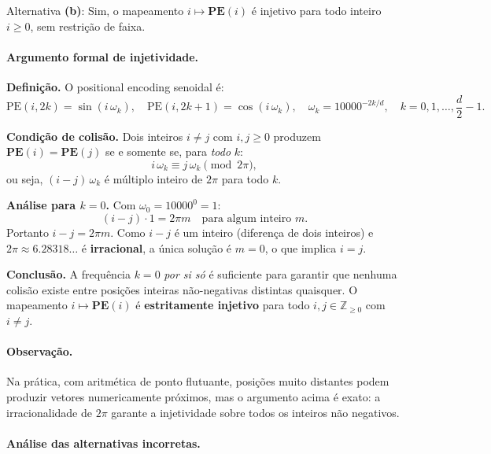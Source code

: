 \documentclass{dlproblemset}
\begin{document}
\begin{respostabox}
Alternativa \textbf{(b)}: Sim, o mapeamento $i \mapsto \mathbf{PE}(i)$ é injetivo
para todo inteiro $i \geq 0$, sem restrição de faixa.
\end{respostabox}

\paragraph{Argumento formal de injetividade.}

\textbf{Definição.} O positional encoding senoidal é:
\[
  \mathrm{PE}(i, 2k)   = \sin\!\left(i\,\omega_k\right),\quad
  \mathrm{PE}(i, 2k+1) = \cos\!\left(i\,\omega_k\right),\quad
  \omega_k = 10000^{-2k/d},\quad k = 0, 1, \ldots, \frac{d}{2}-1.
\]

\textbf{Condição de colisão.} Dois inteiros $i \neq j$ com $i, j \geq 0$ produzem
$\mathbf{PE}(i) = \mathbf{PE}(j)$ se e somente se, para \emph{todo} $k$:
\[
  i\,\omega_k \equiv j\,\omega_k \pmod{2\pi},
\]
ou seja, $(i - j)\,\omega_k$ é múltiplo inteiro de $2\pi$ para todo $k$.

\textbf{Análise para $k = 0$.} Com $\omega_0 = 10000^0 = 1$:
\[
  (i - j) \cdot 1 = 2\pi m \quad \text{para algum inteiro } m.
\]
Portanto $i - j = 2\pi m$. Como $i - j$ é um inteiro (diferença de dois inteiros) e
$2\pi \approx 6.28318\ldots$ é \textbf{irracional}, a única solução é $m = 0$,
o que implica $i = j$.

\textbf{Conclusão.} A frequência $k = 0$ \emph{por si só} é suficiente para garantir
que nenhuma colisão existe entre posições inteiras não-negativas distintas quaisquer.
O mapeamento $i \mapsto \mathbf{PE}(i)$ é \textbf{estritamente injetivo} para todo
$i, j \in \mathbb{Z}_{\geq 0}$ com $i \neq j$.

\paragraph{Observação.}
Na prática, com aritmética de ponto flutuante, posições muito distantes podem
produzir vetores numericamente próximos, mas o argumento acima é exato: a
irracionalidade de $2\pi$ garante a injetividade sobre todos os inteiros
não negativos.

\paragraph{Análise das alternativas incorretas.}
\end{document}
